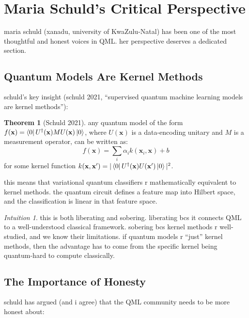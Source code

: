 \documentclass[11pt,a4paper]{article}
\theoremstyle{definition}
\newtheorem{theorem}{Theorem}[section]
\theoremstyle{remark}
\newtheorem*{intuition}{Intuition}
\begin{document}
\section{Maria Schuld's Critical Perspective}

maria schuld (xanadu, university of KwaZulu-Natal) has been one of the most thoughtful and honest voices in QML. her perspective deserves a dedicated section.

\subsection{Quantum Models Are Kernel Methods}

schuld's key insight (schuld 2021, ``supervised quantum machine learning models are kernel methods''):

\begin{theorem}[Schuld 2021]
any quantum model of the form $f(\mathbf{x}) = \bra{0} U^\dagger(\mathbf{x}) M U(\mathbf{x}) \ket{0}$, where $U(\mathbf{x})$ is a data-encoding unitary and $M$ is a measurement operator, can be written as:
\[
f(\mathbf{x}) = \sum_i \alpha_i k(\mathbf{x}_i, \mathbf{x}) + b
\]
for some kernel function $k(\mathbf{x}, \mathbf{x}') = |\bra{0} U^\dagger(\mathbf{x}) U(\mathbf{x}') \ket{0}|^2$.
\end{theorem}

this means that variational quantum classifiers r mathematically equivalent to kernel methods. the quantum circuit defines a feature map into Hilbert space, and the classification is linear in that feature space.

\begin{intuition}
this is both liberating and sobering. liberating bcs it connects QML to a well-understood classical framework. sobering bcs kernel methods r well-studied, and we know their limitations. if quantum models r ``just'' kernel methods, then the advantage has to come from the specific kernel being quantum-hard to compute classically.
\end{intuition}

\subsection{The Importance of Honesty}

schuld has argued (and i agree) that the QML community needs to be more honest about:
\end{document}
